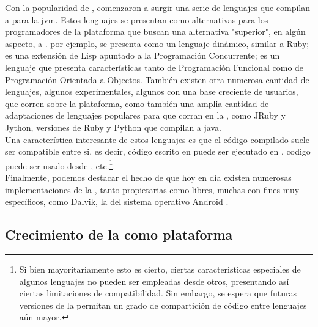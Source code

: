 Con la popularidad de \java, comenzaron a surgir una serie de lenguajes que compilan a
\bytecode para la \gls{jvm}. Estos lenguajes se presentan como alternativas para los
programadores de la plataforma que buscan una alternativa "superior", en algún aspecto,
a \java. \groovy por ejemplo, se presenta como un lenguaje dinámico, similar a Ruby;
\clojure es una extensión de Lisp apuntado a la Programación Concurrente; \scala es un
lenguaje que presenta características tanto de Programación Funcional como de
Programación Orientada a Objectos. También existen otra numerosa cantidad de lenguajes,
algunos experimentales, algunos con una base creciente de usuarios, que corren sobre la
plataforma, como también una amplia cantidad de adaptaciones de lenguajes populares para
que corran en la \jvm, como JRuby y Jython, versiones de Ruby y Python que compilan a
\bytecode java.\\
Una característica interesante de estos lenguajes es que el código compilado suele ser
compatible entre si, es decir, código escrito en \java puede ser ejecutado en \scala,
codigo \groovy puede ser usado desde \clojure, etc.\footnote{
	Si bien mayoritariamente esto es cierto, ciertas caracteristicas especiales de algunos
	lenguajes no pueden ser empleadas desde otros, presentando así ciertas limitaciones de
	compatibilidad. Sin embargo, se espera que futuras versiones de la \jvm permitan un
	grado de compartición de código entre lenguajes aún mayor.
}.\\
Finalmente, podemos destacar el hecho de que hoy en día existen numerosas implementaciones
de la \jvm, tanto propietarias como libres, muchas con fines muy específicos, como Dalvik,
la \jvm del sistema operativo Android .\\


\subsection{Crecimiento de la \jvm como plataforma}
\label{subsec:intro:jvm_growth}

